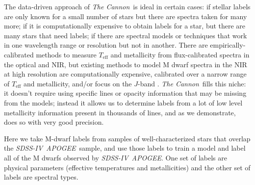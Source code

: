 \documentclass[twocolumn]{aastex62}
\newcommand{\apogee}{\textsl{APOGEE}}
\newcommand{\thecannon}{\textsl{The Cannon}}
\newcommand{\sdssiv}{\textsl{SDSS-IV}}
\newcommand{\teff}{T_{\mathrm{eff}}}
\begin{document}

The data-driven approach of \thecannon\ is ideal in certain cases:
if stellar labels are only known for a small number of stars
but there are spectra taken for many more;
if it is computationally expensive to obtain labels for a star, but
there are many stars that need labels;
if there are spectral models or techniques that work in one wavelength range or resolution but not in another.
There are empirically-calibrated methods to measure $\teff$ and metallicity from flux-calibrated spectra in the optical and NIR, but existing methods to model M dwarf spectra in the NIR at high resolution are computationally expensive, calibrated over a narrow range of $\teff$ and metallicity, and/or focus on the $J$-band \citep{Lindgren:2016, Lindgren:2017}. \thecannon\ fills this niche: it doesn't require using specific lines or opacity information that may be missing from the models; instead it allows us to determine labels from a lot of low level metallicity information present in thousands of lines, and as we demonstrate, does so with very good precision.

Here we take M-dwarf labels from samples of well-characterized stars that overlap the
\sdssiv\ \apogee\ sample, and use those labels to train a model and label all of the M dwarfs observed by
\sdssiv\ \apogee. One set of labels are physical parameters (effective temperatures and metallicities)
and the other set of labels are spectral types. 
\end{document}
